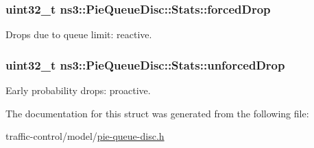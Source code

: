 \subsubsection[{\texorpdfstring{forced\+Drop}{forcedDrop}}]{\setlength{\rightskip}{0pt plus 5cm}uint32\+\_\+t ns3\+::\+Pie\+Queue\+Disc\+::\+Stats\+::forced\+Drop}\hypertarget{structns3_1_1PieQueueDisc_1_1Stats_a40eea66d9bc2ce766df9390776eb88a9}{}\label{structns3_1_1PieQueueDisc_1_1Stats_a40eea66d9bc2ce766df9390776eb88a9}


Drops due to queue limit\+: reactive. 

\subsubsection[{\texorpdfstring{unforced\+Drop}{unforcedDrop}}]{\setlength{\rightskip}{0pt plus 5cm}uint32\+\_\+t ns3\+::\+Pie\+Queue\+Disc\+::\+Stats\+::unforced\+Drop}\hypertarget{structns3_1_1PieQueueDisc_1_1Stats_afe4c9f6e4c910cf47d475ff5d29d5bb0}{}\label{structns3_1_1PieQueueDisc_1_1Stats_afe4c9f6e4c910cf47d475ff5d29d5bb0}


Early probability drops\+: proactive. 



The documentation for this struct was generated from the following file\+:\begin{DoxyCompactItemize}
\item 
traffic-\/control/model/\hyperlink{pie-queue-disc_8h}{pie-\/queue-\/disc.\+h}\end{DoxyCompactItemize}
